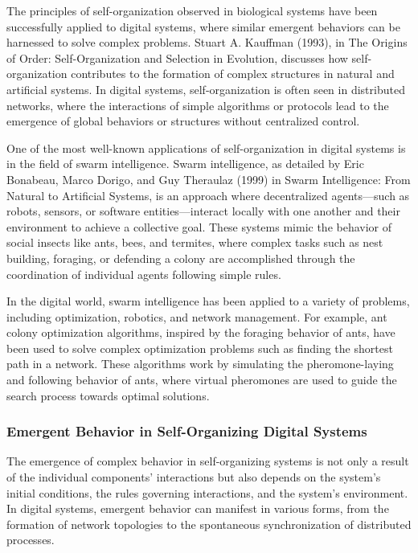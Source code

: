 \documentclass[12pt,twoside]{article}
\begin{document}
The principles of self-organization observed in biological systems have been successfully applied to digital systems, where similar emergent behaviors can be harnessed to solve complex problems. Stuart A. Kauffman (1993), in The Origins of Order: Self-Organization and Selection in Evolution, discusses how self-organization contributes to the formation of complex structures in natural and artificial systems. In digital systems, self-organization is often seen in distributed networks, where the interactions of simple algorithms or protocols lead to the emergence of global behaviors or structures without centralized control.

One of the most well-known applications of self-organization in digital systems is in the field of swarm intelligence. Swarm intelligence, as detailed by Eric Bonabeau, Marco Dorigo, and Guy Theraulaz (1999) in Swarm Intelligence: From Natural to Artificial Systems, is an approach where decentralized agents—such as robots, sensors, or software entities—interact locally with one another and their environment to achieve a collective goal. These systems mimic the behavior of social insects like ants, bees, and termites, where complex tasks such as nest building, foraging, or defending a colony are accomplished through the coordination of individual agents following simple rules.

In the digital world, swarm intelligence has been applied to a variety of problems, including optimization, robotics, and network management. For example, ant colony optimization algorithms, inspired by the foraging behavior of ants, have been used to solve complex optimization problems such as finding the shortest path in a network. These algorithms work by simulating the pheromone-laying and following behavior of ants, where virtual pheromones are used to guide the search process towards optimal solutions.

\subsubsection{Emergent Behavior in Self-Organizing Digital Systems}

The emergence of complex behavior in self-organizing systems is not only a result of the individual components' interactions but also depends on the system's initial conditions, the rules governing interactions, and the system's environment. In digital systems, emergent behavior can manifest in various forms, from the formation of network topologies to the spontaneous synchronization of distributed processes.
\end{document}

